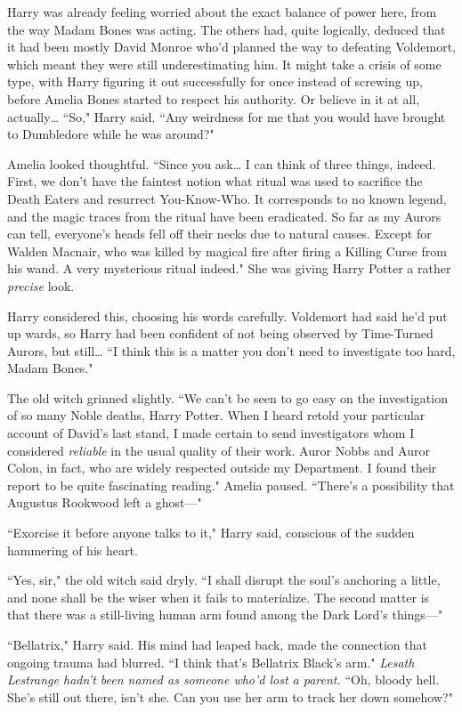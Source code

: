 Harry was already feeling worried about the exact balance of power here, from the way Madam Bones was acting. The others had, quite logically, deduced that it had been mostly David Monroe who'd planned the way to defeating Voldemort, which meant they were still underestimating him. It might take a crisis of some type, with Harry figuring it out successfully for once instead of screwing up, before Amelia Bones started to respect his authority. Or believe in it at all, actually{\ldots} ``So," Harry said. ``Any weirdness for me that you would have brought to Dumbledore while he was around?"

Amelia looked thoughtful. ``Since you ask{\ldots} I can think of three things, indeed. First, we don't have the faintest notion what ritual was used to sacrifice the Death Eaters and resurrect You-Know-Who. It corresponds to no known legend, and the magic traces from the ritual have been eradicated. So far as my Aurors can tell, everyone's heads fell off their necks due to natural causes. Except for Walden Macnair, who was killed by magical fire after firing a Killing Curse from his wand. A very mysterious ritual indeed." She was giving Harry Potter a rather \emph{precise} look.

Harry considered this, choosing his words carefully. Voldemort had said he'd put up wards, so Harry had been confident of not being observed by Time-Turned Aurors, but still{\ldots} ``I think this is a matter you don't need to investigate too hard, Madam Bones."

The old witch grinned slightly. ``We can't be seen to go easy on the investigation of so many Noble deaths, Harry Potter. When I heard retold your particular account of David's last stand, I made certain to send investigators whom I considered \emph{reliable} in the usual quality of their work. Auror Nobbs and Auror Colon, in fact, who are widely respected outside my Department. I found their report to be quite fascinating reading." Amelia paused. ``There's a possibility that Augustus Rookwood left a ghost---"

``Exorcise it before anyone talks to it," Harry said, conscious of the sudden hammering of his heart.

``Yes, sir," the old witch said dryly. ``I shall disrupt the soul's anchoring a little, and none shall be the wiser when it fails to materialize. The second matter is that there was a still-living human arm found among the Dark Lord's things---"

``Bellatrix," Harry said. His mind had leaped back, made the connection that ongoing trauma had blurred. ``I think that's Bellatrix Black's arm." \emph{Lesath Lestrange hadn't been named as someone who'd lost a parent.} ``Oh, bloody hell. She's still out there, isn't she. Can you use her arm to track her down somehow?"

